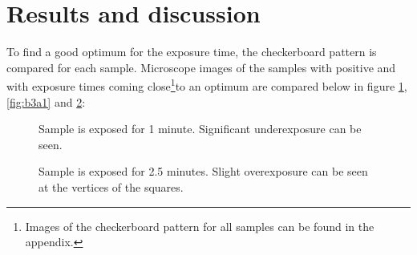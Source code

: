 \section*{Results and discussion}
To find a good optimum for the exposure time, the checkerboard pattern is compared for each sample. Microscope images of the samples with positive  and with exposure times coming close\footnote{Images of the checkerboard pattern for all samples can be found in the appendix.}to an optimum are compared below in figure \ref{fig:b3d1},\ref{fig:b3a1} and \ref{fig:b3e1}:

\begin{figure}[H]
	\centering
	\caption{Sample is exposed for 1 minute. Significant underexposure can be seen.}
	\label{fig:b3d1}
\end{figure}
\begin{figure}[H]
	\centering
	\caption{Sample is exposed for 2.5 minutes. Slight overexposure can be seen at the vertices of the squares.}
	\label{fig:b3e1}
\end{figure}
